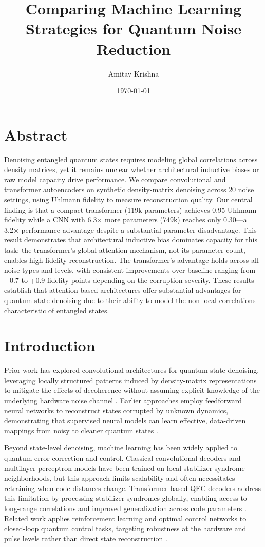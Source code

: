 \documentclass[a4paper, 11pt, colorlinks=true, citecolor=., linkcolor=black, urlcolor=black]{article}
\author{Amitav Krishna}
\date{\today}
\title{Comparing Machine Learning Strategies for Quantum Noise Reduction}
\begin{document}
\maketitle
\section{Abstract}
\label{sec:orge8b742a}
Denoising entangled quantum states requires modeling global correlations across density matrices, yet it remains unclear whether architectural inductive biases or raw model capacity drive performance. We compare convolutional and transformer autoencoders on synthetic density-matrix denoising across 20 noise settings, using Uhlmann fidelity to measure reconstruction quality. Our central finding is that a compact transformer (119k parameters) achieves 0.95 Uhlmann fidelity while a CNN with 6.3× more parameters (749k) reaches only 0.30—a 3.2× performance advantage despite a substantial parameter disadvantage. This result demonstrates that architectural inductive bias dominates capacity for this task: the transformer's global attention mechanism, not its parameter count, enables high-fidelity reconstruction. The transformer's advantage holds across all noise types and levels, with consistent improvements over baseline ranging from +0.7 to +0.9 fidelity points depending on the corruption severity. These results establish that attention-based architectures offer substantial advantages for quantum state denoising due to their ability to model the non-local correlations characteristic of entangled states.
\section{Introduction}
\label{sec:orgfbc386c}
Prior work has explored convolutional architectures for quantum state denoising, leveraging locally structured patterns induced by density-matrix representations to mitigate the effects of decoherence without assuming explicit knowledge of the underlying hardware noise channel \autocite{kendre2025machinelearningquantumnoise}. Earlier approaches employ feedforward neural networks to reconstruct states corrupted by unknown dynamics, demonstrating that supervised neural models can learn effective, data-driven mappings from noisy to cleaner quantum states \autocite{Morgillo_2024}.

Beyond state-level denoising, machine learning has been widely applied to quantum error correction and control. Classical convolutional decoders and multilayer perceptron models have been trained on local stabilizer syndrome neighborhoods, but this approach limits scalability and often necessitates retraining when code distances change. Transformer-based QEC decoders address this limitation by processing stabilizer syndromes globally, enabling access to long-range correlations and improved generalization across code parameters \autocite{wang2023transformerqecquantumerrorcorrection}. Related work applies reinforcement learning and optimal control networks to closed-loop quantum control tasks, targeting robustness at the hardware and pulse levels rather than direct state reconstruction \autocite{Ma_2025}.
\end{document}
